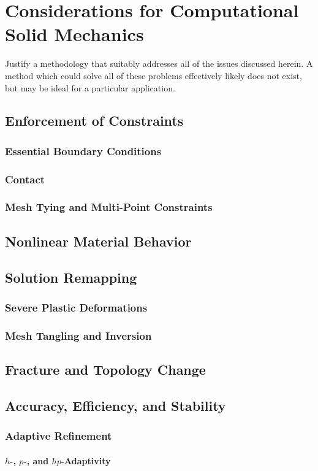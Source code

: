 \chapter{Considerations for Computational Solid Mechanics}
%
Justify a methodology that suitably addresses all of the issues discussed herein. A method which could solve all of these problems effectively likely does not exist, but may be ideal for a particular application.

\section{Enforcement of Constraints}
\subsection{Essential Boundary Conditions}
\subsection{Contact}
\subsection{Mesh Tying and Multi-Point Constraints}

\section{Nonlinear Material Behavior}

\section{Solution Remapping}
\subsection{Severe Plastic Deformations}
\subsection{Mesh Tangling and Inversion}

\section{Fracture and Topology Change}

\section{Accuracy, Efficiency, and Stability}
\subsection{Adaptive Refinement}
\subsubsection{$h$-, $p$-, and $hp$-Adaptivity}
